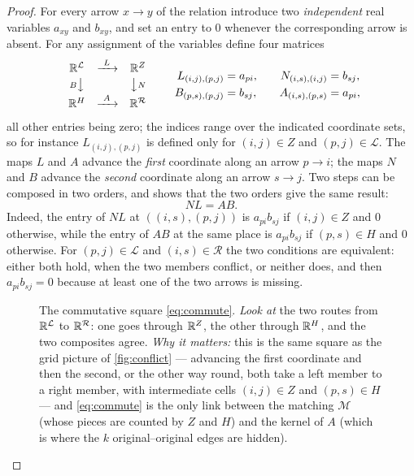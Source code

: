\begin{proof}
For every arrow $x\to y$ of the relation introduce two \emph{independent} real variables
$a_{xy}$ and $b_{xy}$, and set an entry to $0$ whenever the corresponding arrow is absent. For any
assignment of the variables define four matrices
\begin{equation}\label{eq:fourmaps}
 \begin{array}{ccc}
 \mathbb R^{\mathcal L}&\xrightarrow{\ L\ }&\mathbb R^{Z}\\[2pt]
 {\scriptstyle B}\big\downarrow&&\big\downarrow{\scriptstyle N}\\[2pt]
 \mathbb R^{H}&\xrightarrow{\ A\ }&\mathbb R^{\mathcal R}
 \end{array}
 \qquad
 \begin{aligned}
  L_{(i,j),(p,j)}&=a_{pi},&\quad N_{(i,s),(i,j)}&=b_{sj},\\
  B_{(p,s),(p,j)}&=b_{sj},&\quad A_{(i,s),(p,s)}&=a_{pi},
 \end{aligned}
\end{equation}
all other entries being zero; the indices range over the indicated coordinate sets, so for instance
$L_{(i,j),(p,j)}$ is defined only for $(i,j)\in Z$ and $(p,j)\in\mathcal L$. The maps $L$ and $A$
advance the \emph{first} coordinate along an arrow $p\to i$; the maps $N$ and $B$ advance the
\emph{second} coordinate along an arrow $s\to j$. Two steps can be composed in two orders, and
 shows that the two orders give the same result:
\begin{equation}\label{eq:commute}
 NL=AB .
\end{equation}
Indeed, the entry of $NL$ at $((i,s),(p,j))$ is $a_{pi}b_{sj}$ if $(i,j)\in Z$ and $0$ otherwise,
while the entry of $AB$ at the same place is $a_{pi}b_{sj}$ if $(p,s)\in H$ and $0$ otherwise. For
$(p,j)\in\mathcal L$ and $(i,s)\in\mathcal R$ the two conditions are equivalent: either both hold,
when the two members conflict, or neither does, and then $a_{pi}b_{sj}=0$ because at least one of
the two arrows is missing.

\begin{figure}[t]
\centering

\caption{The commutative square \eqref{eq:commute}. \emph{Look at} the two routes from
 $\mathbb R^{\mathcal L}$ to $\mathbb R^{\mathcal R}$: one goes through $\mathbb R^{Z}$, the other through $\mathbb R^{H}$, and
 the two composites agree. \emph{Why it matters:} this is the same square as the grid picture of
 \cref{fig:conflict} --- advancing the first coordinate and then the second, or the other way round,
 both take a left member to a right member, with intermediate cells $(i,j)\in Z$ and
 $(p,s)\in H$ --- and \eqref{eq:commute} is the only link between the matching $\mathcal M$ (whose
 pieces are counted by $Z$ and $H$) and the kernel of $A$ (which is where the $k$
 original--original edges are hidden).}
\label{fig:fourmaps}
\end{figure}


\end{proof}
